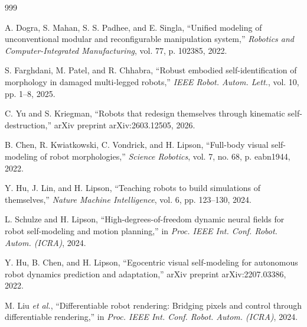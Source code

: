 \documentclass[12pt,a4paper,oneside]{report}
\begin{document}
\begin{thebibliography}{999}

A. Dogra, S. Mahan, S. S. Padhee, and E. Singla, ``Unified modeling of unconventional modular and reconfigurable manipulation system,'' \textit{Robotics and Computer-Integrated Manufacturing}, vol. 77, p. 102385, 2022.




S. Farghdani, M. Patel, and R. Chhabra, ``Robust embodied self-identification of morphology in damaged multi-legged robots,'' \textit{IEEE Robot. Autom. Lett.}, vol. 10, pp. 1--8, 2025.




C. Yu and S. Kriegman, ``Robots that redesign themselves through kinematic self-destruction,'' arXiv preprint arXiv:2603.12505, 2026.





B. Chen, R. Kwiatkowski, C. Vondrick, and H. Lipson, ``Full-body visual self-modeling of robot morphologies,'' \textit{Science Robotics}, vol. 7, no. 68, p. eabn1944, 2022.




Y. Hu, J. Lin, and H. Lipson, ``Teaching robots to build simulations of themselves,'' \textit{Nature Machine Intelligence}, vol. 6, pp. 123--130, 2024.




L. Schulze and H. Lipson, ``High-degrees-of-freedom dynamic neural fields for robot self-modeling and motion planning,'' in \textit{Proc. IEEE Int. Conf. Robot. Autom. (ICRA)}, 2024.




Y. Hu, B. Chen, and H. Lipson, ``Egocentric visual self-modeling for autonomous robot dynamics prediction and adaptation,'' arXiv preprint arXiv:2207.03386, 2022.




M. Liu \textit{et al.}, ``Differentiable robot rendering: Bridging pixels and control through differentiable rendering,'' in \textit{Proc. IEEE Int. Conf. Robot. Autom. (ICRA)}, 2024.




\end{thebibliography}
\end{document}
